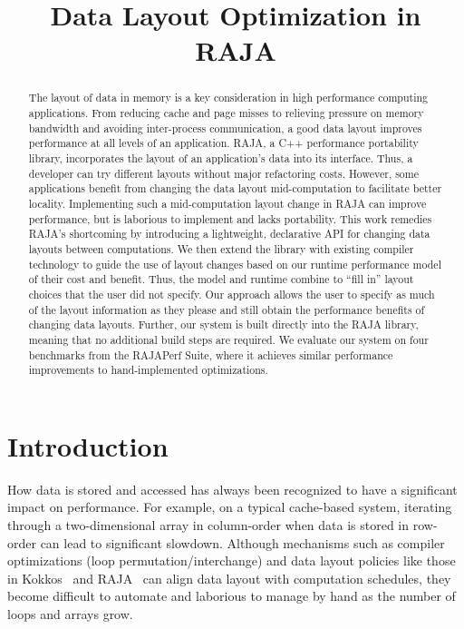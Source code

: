 \documentclass[sigconf,review=true]{acmart}
\title{Data Layout Optimization in RAJA}
\begin{document}
\begin{abstract}

The layout of data in memory is a key consideration in high performance computing applications.
From reducing cache and page misses to relieving pressure on memory bandwidth and avoiding inter-process communication, a good data layout improves performance at all levels of an application.
RAJA, a C++ performance portability library, incorporates the layout of an application's data into its interface.
Thus, a developer can try different layouts without major refactoring costs.
However, some applications benefit from changing the data layout mid-computation to facilitate better locality.
Implementing such a mid-computation layout change in RAJA can improve performance, but is laborious to implement and lacks portability.
This work remedies RAJA's shortcoming by introducing a lightweight, declarative API for changing data layouts between computations.
We then extend the library with existing compiler technology to guide the use of layout changes based on our runtime performance model of their cost and benefit.
Thus, the model and runtime combine to \enquote{fill in} layout choices that the user did not specify.
Our approach allows the user to specify as much of the layout information as they please and still obtain the performance benefits of changing data layouts.  
Further, our system is built directly into the RAJA library, meaning that no additional build steps are required.
We evaluate our system on four benchmarks from the RAJAPerf Suite, where it achieves similar performance improvements to hand-implemented optimizations.
\end{abstract}
\maketitle
\def\@textbottom{\vskip \z@ \@plus 1pt}




\section{Introduction}

How data is stored and accessed has always been recognized to have a significant impact on performance. 
For example, on a typical cache-based system, iterating through a two-dimensional array in column-order when data is 
stored in row-order can lead to significant slowdown. 
Although mechanisms such as compiler optimizations (loop permutation/interchange) 
and data layout policies like those in Kokkos~\cite{edwards2014kokkos} and RAJA~\cite{hornung2014RAJA} can align data layout with computation schedules, they become difficult to automate and laborious to manage by hand as the number of loops and arrays grow.
\end{document}

